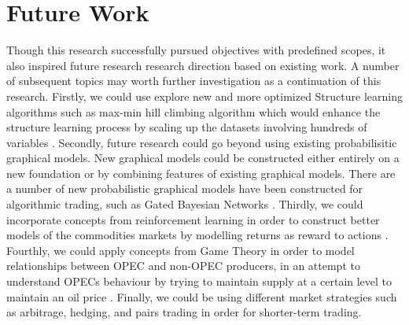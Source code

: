 \section{Future Work}

Though this research successfully pursued objectives with predefined scopes, it also inspired future research research direction based on existing work. A number of subsequent topics may worth further investigation as a continuation of this research. Firstly, we could use explore new and more optimized Structure learning algorithms such as max-min hill climbing algorithm which would enhance the structure learning process by scaling up the datasets involving hundreds of variables \cite{brown2004novel}. Secondly, future research could go beyond using existing probabilisitic graphical models. New graphical models could be constructed either entirely on a new foundation or by combining features of existing graphical models. There are a number of new probabilistic graphical models have been constructed for algorithmic trading, such as Gated Bayesian Networks \cite{bendtsen2017gated}. Thirdly, we could incorporate concepts from reinforcement learning in order to construct better models of the commodities markets by modelling returns as reward to actions \cite{nevmyvaka2006reinforcement}.  Fourthly, we could apply concepts from Game Theory in order to model relationships between OPEC and non-OPEC producers, in an attempt to understand OPECs behaviour by trying to maintain supply at a certain level to maintain an oil price \cite{opecnonopec}. Finally, we could be using different market strategies such as arbitrage, hedging, and pairs trading in order for shorter-term trading.  